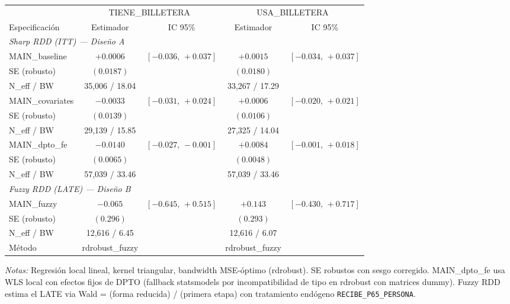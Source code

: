 \documentclass[12pt, a4paper]{article}
\begin{document}
\begin{threeparttable}
\begin{tabular}{l cc cc}
\toprule
 & \multicolumn{2}{c}{TIENE\_BILLETERA} & \multicolumn{2}{c}{USA\_BILLETERA} \\
\cmidrule(lr){2-3} \cmidrule(lr){4-5}
Especificación & Estimador & IC 95\% & Estimador & IC 95\% \\
\midrule
\multicolumn{5}{l}{\textit{Sharp RDD (ITT) --- Diseño A}} \\
MAIN\_baseline & $+0.0006$ & $[-0.036,\,+0.037]$ & $+0.0015$ & $[-0.034,\,+0.037]$ \\
\quad SE (robusto) & $(0.0187)$ & & $(0.0180)$ & \\
\quad N\_eff / BW & 35{,}006 / 18.04 & & 33{,}267 / 17.29 & \\[4pt]
MAIN\_covariates & $-0.0033$ & $[-0.031,\,+0.024]$ & $+0.0006$ & $[-0.020,\,+0.021]$ \\
\quad SE (robusto) & $(0.0139)$ & & $(0.0106)$ & \\
\quad N\_eff / BW & 29{,}139 / 15.85 & & 27{,}325 / 14.04 & \\[4pt]
MAIN\_dpto\_fe & $-0.0140$ & $[-0.027,\,-0.001]$ & $+0.0084$ & $[-0.001,\,+0.018]$ \\
\quad SE (robusto) & $(0.0065)$ & & $(0.0048)$ & \\
\quad N\_eff / BW & 57{,}039 / 33.46 & & 57{,}039 / 33.46 & \\
\midrule
\multicolumn{5}{l}{\textit{Fuzzy RDD (LATE) --- Diseño B}} \\
MAIN\_fuzzy & $-0.065$ & $[-0.645,\,+0.515]$ & $+0.143$ & $[-0.430,\,+0.717]$ \\
\quad SE (robusto) & $(0.296)$ & & $(0.293)$ & \\
\quad N\_eff / BW & 12{,}616 / 6.45 & & 12{,}616 / 6.07 & \\
\quad Método & rdrobust\_fuzzy & & rdrobust\_fuzzy & \\
\bottomrule
\end{tabular}
\begin{tablenotes}
\small
\item \textit{Notas:} Regresión local lineal, kernel triangular, bandwidth MSE-óptimo (rdrobust). SE robustos con sesgo corregido. MAIN\_dpto\_fe usa WLS local con efectos fijos de DPTO (fallback statsmodels por incompatibilidad de tipo en rdrobust con matrices dummy). Fuzzy RDD estima el LATE via Wald = (forma reducida) / (primera etapa) con tratamiento endógeno \texttt{RECIBE\_P65\_PERSONA}.
\end{tablenotes}
\end{threeparttable}
\end{document}

